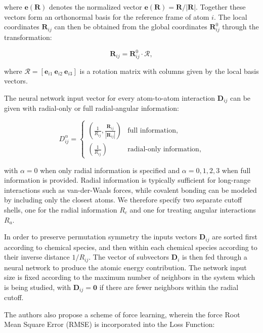 where $\bm{e}(\bm{R})$ denotes the normalized vector $\bm{e}(\bm{R})
    = \bm{R} / \left| \bm{R} \right|$. Together these vectors
form an orthonormal basis for the reference frame of atom $i$.
The local coordinates $\bm{R}_{ij}$
can then be obtained from the global coordinates $\bm{R}_{ij}^0$
through the transformation:

\begin{equation}
    \bm{R}_{ij} = \bm{R}_{ij}^0 \cdot \mathcal{R} ,
\end{equation}

where $\mathcal{R} = [\bm{e}_{i1} \ \bm{e}_{i2} \ \bm{e}_{i3}]$
is a rotation matrix with columns given by the local basis vectors.
\par
The neural network input vector for every atom-to-atom interaction
$\bm{D}_{ij}$ can be given with radial-only or full radial-angular
information:

\begin{equation}
    D_{ij}^{\alpha} =
\begin{cases}
    \displaystyle\left( \frac{1}{R_{ij}}, \frac{\bm{R}_{ij}}{\left| \bm{R}_{ij} \right|}
    \right) & \text{full information}, \\[10pt]
    \displaystyle\left( \frac{1}{R_{ij}} \right) & \text{radial-only information},
\end{cases}
\end{equation}

with $\alpha = 0$ when only radial information is specified
and $\alpha = 0,1,2,3$ when full information is provided. Radial information
is typically sufficient for long-range interactions such as van-der-Waals
forces, while covalent bonding can be modeled by including
only the closest atoms. We therefore specify two separate
cutoff shells, one for the radial information $R_c$ and one
for treating angular interactions $R_a$.
\par
In order to preserve permutation symmetry the inputs vectors $\bm{D}_{ij}$
are sorted first according to chemical species, and then within
each chemical species according to their inverse distance $1 / R_{ij}$.
The vector of subvectors $\bm{D}_i$ is then fed through a neural
network to produce the atomic energy contribution.
The network input size is fixed according to the maximum number of neighbors
in the system which is being studied, with $\bm{D}_{ij} = \bm{0}$
if there are fewer neighbors within the radial cutoff.
\par
The authors also propose a scheme of force learning, wherein
the force Root Mean Square Error (RMSE) is incorporated into the Loss Function:

